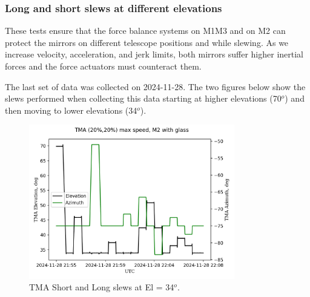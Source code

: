 \subsubsection{Long and short slews at different elevations}
\label{subsubsec:long_and_short_slews}

These tests ensure that the force balance systems on M1M3 and on M2 can protect
the mirrors on different telescope positions and while slewing. As we increase
velocity, acceleration, and jerk limits, both mirrors suffer higher inertial
forces and the force actuators must counteract them.


The last set of data was collected on 2024-11-28. The two figures below show the
slews performed when collecting this data starting at higher elevations (70$^o$)
and then moving to lower elevations (34$^o$).

\begin{figure}
    \centering
    \includegraphics[width=0.8\textwidth]{spa/20_vel_acc_jerk/BLOCK-T227_azel_slews.png}
    \caption{TMA Short and Long slews at El = 34$^o$.}
    \label{fig:block227_azel_slews}
    \end{figure}

